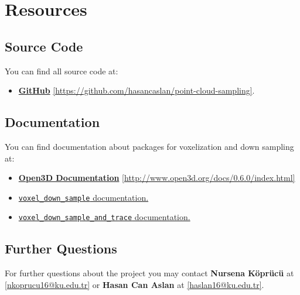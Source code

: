 \documentclass[a4paper]{article}
\makeatletter
\newcommand{\contactName}{Nursena Köprücü}
\newcommand{\contactMail}{nkoprucu16@ku.edu.tr}
\newcommand{\contactNameII}{Hasan Can Aslan}
\newcommand{\contactMailII}{haslan16@ku.edu.tr}
\makeatother
\begin{document}
\section{Resources}
\subsection{Source Code}
You can find all source code at:
\begin{itemize}
\item
\textbf{\href{https://github.com/hasancaslan/point-cloud-sampling}{GitHub}} \href{https://github.com/hasancaslan/point-cloud-sampling}{[https://github.com/hasancaslan/point-cloud-sampling]}.
\end{itemize}

\subsection{Documentation}
You can find documentation about packages for voxelization and down sampling at:
\begin{itemize}
\item
\textbf{\href{http://www.open3d.org/docs/0.6.0/index.html}{Open3D Documentation}}
\href{http://www.open3d.org/docs/0.6.0/index.html}{[http://www.open3d.org/docs/0.6.0/index.html]}
\item
\href{http://www.open3d.org/docs/0.6.0/python_api/open3d.geometry.voxel_down_sample.html?highlight=voxel_down_sample}{\texttt{voxel\_down\_sample} documentation.}
\item
\href{http://www.open3d.org/docs/0.6.0/python_api/open3d.geometry.voxel_down_sample_and_trace.html}{\texttt{voxel\_down\_sample\_and\_trace} documentation.}
\end{itemize}

\subsection{Further Questions}
For further questions about the project you may contact \textbf{\contactName} at \href{mailto:\contactMail}{\mbox{[\contactMail]}} or \textbf{\contactNameII} at \href{mailto:\contactMailII}{\mbox{[\contactMailII]}}.

\medskip



\end{document}
